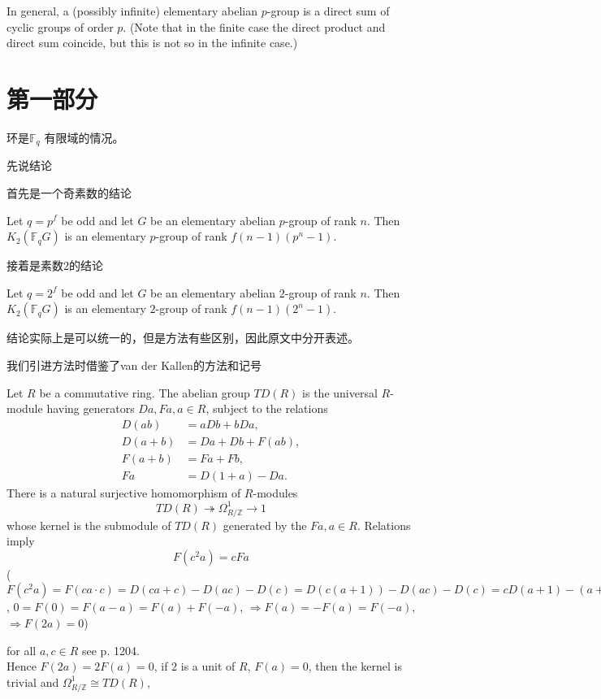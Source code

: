 In general, a (possibly infinite) elementary abelian $p$-group is a direct sum of cyclic groups of order $p$. (Note that in the finite case the direct product and direct sum coincide, but this is not so in the infinite case.)



\section{第一部分} %
\label{sec:第一部分}
环是$\mathbb{F}_q$ 有限域的情况。

先说结论

首先是一个奇素数的结论
\begin{prop}
\label{prop:podd}
	Let $q=p^f$ be odd and let $G$ be an elementary abelian $p$-group of rank $n$.
	Then $K_2(\mathbb{F}_qG)$ is an elementary $p$-group of rank $f(n-1)(p^n-1)$.
\end{prop}
接着是素数$2$的结论
\begin{prop}
	Let $q=2^f$ be odd and let $G$ be an elementary abelian $2$-group of rank $n$.
	Then $K_2(\mathbb{F}_qG)$ is an elementary $2$-group of rank $f(n-1)(2^n-1)$.
\end{prop}

结论实际上是可以统一的，但是方法有些区别，因此原文中分开表述。

我们引进方法时借鉴了van der Kallen的方法和记号

Let $R$ be a commutative ring. The abelian group  $TD(R)$  is the universal $R$-module having generators  $Da, Fa, a \in R$,  subject to the relations
\begin{align*}
D(ab) &= aDb + bDa,\\
D(a + b) &= Da + Db + F(ab),\\
F(a + b) &= Fa + Fb,\\
Fa  &= D(1  + a)- Da.
\end{align*}
There is a natural surjective homomorphism of $R$-modules
\[TD(R)\twoheadrightarrow \Omega^1_{R/\mathbb{Z}}\longrightarrow 1\]
whose kernel is the submodule of  $TD(R)$  generated by the  $Fa, a\in R$.  Relations
imply
\[
F(c^2a)=cFa
\]
($F(c^2a)=F(ca\cdot c)=D(ca+c)-D(ac)-D(c)=D(c(a+1))-D(ac)-D(c)=cD(a+1)-(a+1)D(c)-aD(c)-cD(a)-D(c)=cF(a)$, $0=F(0)=F(a-a)=F(a)+F(-a)$, $\Rightarrow F(a)=-F(a)=F(-a)$, $\Rightarrow F(2a)=0$)

for all  $a, c \in R$  see \cite{MR45:252}p. 1204. \\
Hence $F(2a)=2F(a)=0$, if $2$ is a unit of $R$, $F(a)=0$, then the kernel is trivial and $\Omega^1_{R/\mathbb{Z}}\cong  TD(R)$,

